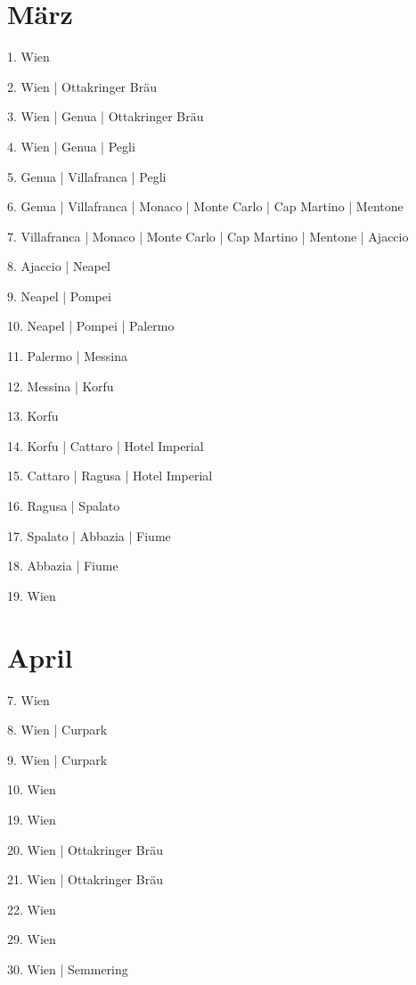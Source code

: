 \documentclass[twoside=false,titlepage=false,open=any, parskip=never, fontsize=10pt, headings=small, chapterprefix=false, appendixprefix=false, DIV=15]{scrbook}
\begin{document}
\begin{multicols}{3}
            \section*{März}
            1. Wien\par
            2. Wien | Ottakringer Bräu\par
            3. Wien | Genua | Ottakringer Bräu\par
            4. Wien | Genua | Pegli\par
            5. Genua | Villafranca | Pegli\par
            6. Genua | Villafranca | Monaco | Monte Carlo | Cap Martino | Mentone\par
            7. Villafranca | Monaco | Monte Carlo | Cap Martino | Mentone | Ajaccio\par
            8. Ajaccio | Neapel\par
            9. Neapel | Pompei\par
            10. Neapel | Pompei | Palermo\par
            11. Palermo | Messina\par
            12. Messina | Korfu\par
            13. Korfu\par
            14. Korfu | Cattaro | Hotel Imperial\par
            15. Cattaro | Ragusa | Hotel Imperial\par
            16. Ragusa | Spalato\par
            17. Spalato | Abbazia | Fiume\par
            18. Abbazia | Fiume\par
            19. Wien\par
            \section*{April}
            7. Wien\par
            8. Wien | Curpark\par
            9. Wien | Curpark\par
            10. Wien\par
            19. Wien\par
            20. Wien | Ottakringer Bräu\par
            21. Wien | Ottakringer Bräu\par
            22. Wien\par
            29. Wien\par
            30. Wien | Semmering\par

\end{multicols}
\end{document}
